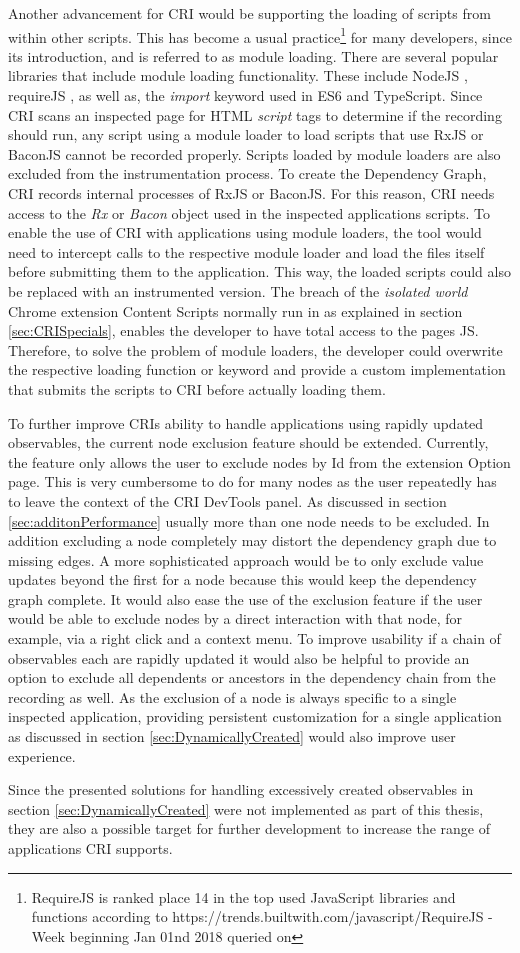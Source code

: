 Another advancement for CRI would be supporting the loading of scripts from within other scripts. This has become a usual practice\footnote{RequireJS is ranked place 14 in the top used JavaScript libraries and functions according to https://trends.builtwith.com/javascript/RequireJS - Week beginning Jan 01nd 2018 queried on \date{2018-01-03}} for many developers, since its introduction, and is referred to as module loading. There are several popular libraries that include module loading functionality. These include NodeJS \cite{NodeJS}, requireJS \cite{RequireJS}, as well as, the \emph{import} keyword used in ES6 and TypeScript. Since CRI scans an inspected page for HTML \emph{script} tags to determine if the recording should run, any script using a module loader to load scripts that use RxJS or BaconJS cannot be recorded properly. Scripts loaded by module loaders are also excluded from the instrumentation process. To create the Dependency Graph, CRI records internal processes of RxJS or BaconJS. For this reason, CRI needs access to the \emph{Rx} or \emph{Bacon} object used in the inspected applications scripts. To enable the use of CRI with applications using module loaders, the tool would need to intercept calls to the respective module loader and load the files itself before submitting them to the application. This way, the loaded scripts could also be replaced with an instrumented version. The breach of the \emph{isolated world} Chrome extension Content Scripts normally run in as explained in section \ref{sec:CRISpecials}, enables the developer to have total access to the pages JS. Therefore, to solve the problem of module loaders, the developer could overwrite the respective loading function or keyword and provide a custom implementation that submits the scripts to CRI before actually loading them.
	
To further improve CRIs ability to handle applications using rapidly updated observables, the current node exclusion feature should be extended. Currently, the feature only allows the user to exclude nodes by Id from the extension Option page. This is very cumbersome to do for many nodes as the user repeatedly has to leave the context of the CRI DevTools panel. As discussed in section \ref{sec:additonPerformance} usually more than one node needs to be excluded. In addition excluding a node completely may distort the dependency graph due to missing edges. A more sophisticated approach would be to only exclude value updates beyond the first for a node because this would keep the dependency graph complete. It would also ease the use of the exclusion feature if the user would be able to exclude nodes by a direct interaction with that node, for example, via a right click and a context menu. To improve usability if a chain of observables each are rapidly updated it would also be helpful to provide an option to exclude all dependents or ancestors in the dependency chain from the recording as well.
As the exclusion of a node is always specific to a single inspected application, providing persistent customization for a single application as discussed in section \ref{sec:DynamicallyCreated} would also improve user experience.

Since the presented solutions for handling excessively created observables in section \ref{sec:DynamicallyCreated} were not implemented as part of this thesis, they are also a possible target for further development to increase the range of applications CRI supports.
 	

